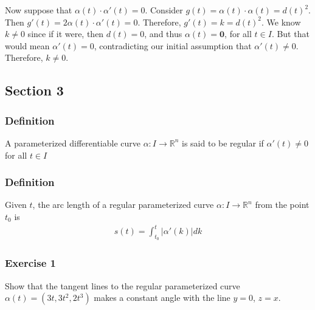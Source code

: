 \documentclass{article}
\newcommand{\R}{\mathbb{R}}
\begin{document}
	Now suppose that $\alpha(t) \cdot \alpha'(t) = 0$. Consider $g(t) = \alpha(t) \cdot \alpha(t) = d(t)^2$. Then $g'(t) = 2 \alpha(t) \cdot \alpha'(t) = 0$. Therefore, $g'(t) = k = d(t)^2$. We know $k \neq 0$ since if it were, then $d(t) = 0$, and thus $\alpha(t) = \mathbf{0}$, for all $t \in I$. But that would mean $\alpha'(t) = 0$, contradicting our initial assumption that $\alpha'(t) \neq 0$. Therefore, $k \neq 0$.
	
	
	\subsection*{Section 3}
	\subsubsection*{Definition}
	A parameterized differentiable curve $\alpha \colon I \to \R^n$ is said to be regular if $\alpha'(t) \neq 0$ for all $t \in I$

	\subsubsection*{Definition}
	Given $t$, the arc length of a regular parameterized curve $\alpha \colon I \to \R^n$ from the point $t_0$ is
	\begin{gather*}
		s(t) = \int_{t_0}^t |\alpha'(k)| dk
	\end{gather*} 
	
	\subsubsection*{Exercise 1}
	Show that the tangent lines to the regular parameterized curve $\alpha(t) = (3t, 3t^2, 2t^3)$ makes a constant angle with the line $y = 0$, $z = x$.
	
\end{document}
